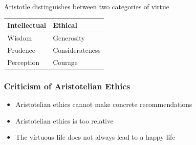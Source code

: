 \documentclass[11pt]{article}
\theoremstyle{definition}
\begin{document}
Aristotle distinguishes between two categories of virtue
\begin{tabularx}{\linewidth}{l @{\hskip 2cm} l}
	\textbf{Intellectual} & \textbf{Ethical}\\
	\hline
	Wisdom & Generosity \\
	Prudence & Considerateness \\
	Perception & Courage \\
\end{tabularx}

\subsubsection{Criticism of Aristotelian Ethics}
\begin{itemize}[label=-]
	\item Aristotelian ethics cannot make concrete recommendations
	\item Aristotelian ethics is too relative
	\item The virtuous life does not always lead to a happy life
\end{itemize}
\end{document}
